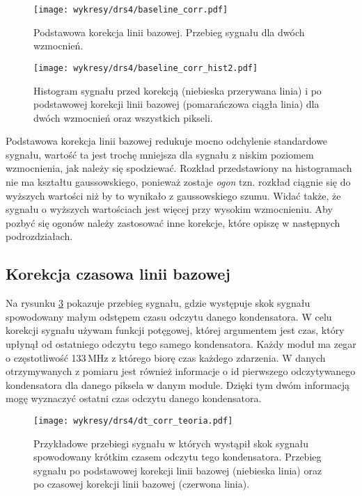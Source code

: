 \documentclass[a4paper,11pt,twoside]{article}
\begin{document}
\begin{figure}[H] 
\centering
\texttt{[image: wykresy/drs4/baseline\_corr.pdf]}
\caption{Podstawowa korekcja linii bazowej. Przebieg sygnału dla dwóch wzmocnień.}
\label{fig:baseline_corr}
\end{figure}

\begin{figure}[H] 
\centering
\texttt{[image: wykresy/drs4/baseline\_corr\_hist2.pdf]}
\caption{Histogram sygnału przed korekcją (niebieska przerywana linia) i po podstawowej korekcji linii bazowej (pomarańczowa ciągła linia) dla dwóch wzmocnień oraz wszystkich pikseli. }
\label{fig:baseline_corr_hist}
\end{figure}
Podstawowa korekcja linii bazowej redukuje mocno odchylenie standardowe sygnału, wartość ta jest trochę mniejsza dla sygnału z niskim poziomem wzmocnienia, jak należy się spodziewać. Rozkład przedstawiony na histogramach nie ma kształtu gaussowskiego, ponieważ zostaje \textsl{ogon}  tzn. rozkład ciągnie się do wyższych wartości niż by to wynikało z gaussowskiego szumu. Widać także, że sygnału o wyższych wartościach jest więcej przy wysokim wzmocnieniu. Aby pozbyć się ogonów należy zastosować inne korekcje, które opiszę w następnych podrozdziałach.

\subsection{Korekcja czasowa linii bazowej}
Na rysunku \ref{fig:dt_corr_Waveform} pokazuje przebieg sygnału, gdzie występuje skok sygnału spowodowany małym odstępem czasu odczytu danego kondensatora. W celu korekcji sygnału używam funkcji potęgowej, której argumentem jest czas, który upłynął od ostatniego odczytu tego samego kondensatora.  Każdy moduł ma zegar o częstotliwość 133\,MHz z którego biorę czas każdego zdarzenia. W danych otrzymywanych z pomiaru jest również informacje o id pierwszego odczytywanego kondensatora dla danego piksela w danym module. Dzięki tym dwóm informacją mogę wyznaczyć ostatni czas odczytu danego kondensatora. 
\begin{figure}[H] 
\centering
\texttt{[image: wykresy/drs4/dt\_corr\_teoria.pdf]}
\caption{Przykładowe przebiegi sygnału w których wystąpił skok sygnału spowodowany krótkim czasem odczytu tego kondensatora. Przebieg sygnału po podstawowej korekcji linii bazowej (niebieska linia) oraz po czasowej korekcji linii bazowej (czerwona linia).}
\label{fig:dt_corr_Waveform}
\end{figure}
\end{document}
